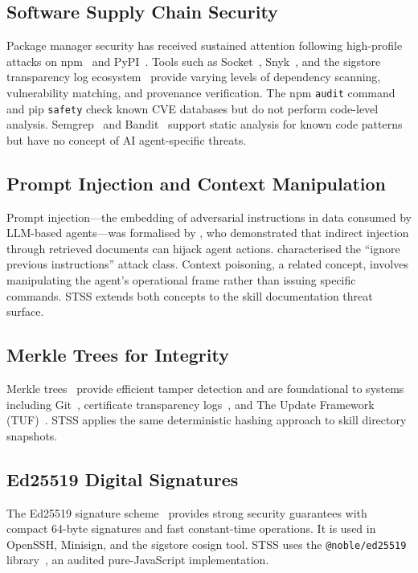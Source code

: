 \documentclass[11pt,twocolumn]{article}
\begin{document}
\subsection{Software Supply Chain Security}

Package manager security has received sustained attention following high-profile
attacks on npm~\cite{npmtyposquatting2016} and PyPI~\cite{pypi2022malicious}.
Tools such as Socket~\cite{socketdev}, Snyk~\cite{snyk}, and the sigstore
transparency log ecosystem~\cite{sigstore2022} provide varying levels of
dependency scanning, vulnerability matching, and provenance verification.
The npm \texttt{audit} command and pip \texttt{safety} check known CVE databases
but do not perform code-level analysis. Semgrep~\cite{semgrep2022} and
Bandit~\cite{bandit} support static analysis for known code patterns but have
no concept of AI agent-specific threats.

\subsection{Prompt Injection and Context Manipulation}

Prompt injection---the embedding of adversarial instructions in data consumed
by LLM-based agents---was formalised by \citet{greshake2023indirect}, who
demonstrated that indirect injection through retrieved documents can hijack
agent actions. \citet{perez2022ignore} characterised the ``ignore previous
instructions'' attack class. Context poisoning, a related concept, involves
manipulating the agent's operational frame rather than issuing specific commands.
STSS extends both concepts to the skill documentation threat surface.

\subsection{Merkle Trees for Integrity}

Merkle trees~\cite{merkle1987digital} provide efficient tamper detection and
are foundational to systems including Git~\cite{git}, certificate transparency
logs~\cite{rfc6962}, and The Update Framework (TUF)~\cite{tuf2010}. STSS
applies the same deterministic hashing approach to skill directory snapshots.

\subsection{Ed25519 Digital Signatures}

The Ed25519 signature scheme~\cite{bernstein2011ed25519} provides strong
security guarantees with compact 64-byte signatures and fast constant-time
operations. It is used in OpenSSH, Minisign, and the sigstore cosign tool.
STSS uses the \texttt{@noble/ed25519} library~\cite{noble2023}, an
audited pure-JavaScript implementation.
\end{document}
